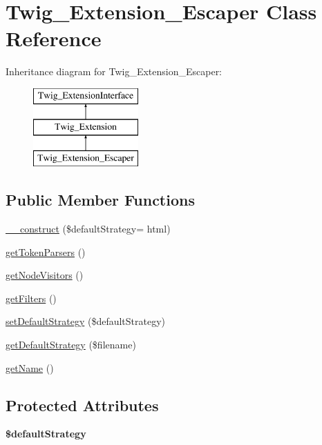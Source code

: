 \hypertarget{classTwig__Extension__Escaper}{}\section{Twig\+\_\+\+Extension\+\_\+\+Escaper Class Reference}
\label{classTwig__Extension__Escaper}
Inheritance diagram for Twig\+\_\+\+Extension\+\_\+\+Escaper\+:\begin{figure}[H]
\begin{center}
\leavevmode
\includegraphics[height=3.000000cm]{classTwig__Extension__Escaper}
\end{center}
\end{figure}
\subsection*{Public Member Functions}
\begin{DoxyCompactItemize}
\item 
\hyperlink{classTwig__Extension__Escaper_a96db1f66f4d1e0290e1ebfee2c067a2f}{\+\_\+\+\_\+construct} (\$default\+Strategy= \textquotesingle{}html\textquotesingle{})
\item 
\hyperlink{classTwig__Extension__Escaper_adb6a00f821f48a3e7a49cd097a8b27ac}{get\+Token\+Parsers} ()
\item 
\hyperlink{classTwig__Extension__Escaper_a30c062132cfc6015c15dd78ed0be0ebb}{get\+Node\+Visitors} ()
\item 
\hyperlink{classTwig__Extension__Escaper_ab24168d3f748de6dd09fab449b9f7cbe}{get\+Filters} ()
\item 
\hyperlink{classTwig__Extension__Escaper_a9918931abe937a86ecb8b75c79c48d09}{set\+Default\+Strategy} (\$default\+Strategy)
\item 
\hyperlink{classTwig__Extension__Escaper_a8e0bba2c299af50acd64375f33515ecb}{get\+Default\+Strategy} (\$filename)
\item 
\hyperlink{classTwig__Extension__Escaper_a2f9f73682519273c075803ce9e566e29}{get\+Name} ()
\end{DoxyCompactItemize}
\subsection*{Protected Attributes}
\begin{DoxyCompactItemize}
\item 
{\bfseries \$default\+Strategy}\hypertarget{classTwig__Extension__Escaper_a7a0c40c8545c38b70209a10291d2cc11}{}\label{classTwig__Extension__Escaper_a7a0c40c8545c38b70209a10291d2cc11}

\end{DoxyCompactItemize}


